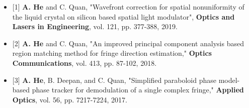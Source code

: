 \documentclass[a4paper,12pt]{article} %
\begin{document}
\begin{itemize} [leftmargin=0cm]
	\setlength\itemsep{-0.15em}
	\item[] {[1] \textbf{A. He} and C. Quan, "Wavefront correction for spatial nonuniformity of the liquid crystal on silicon based spatial light modulator",\textbf{ Optics and Lasers in Engineering}, vol. 121, pp. 377-388, 2019. }
	\item[] {[2] \textbf{A. He} and C. Quan, "An improved principal component analysis based region matching method for fringe direction estimation," \textbf{Optics Communications}, vol. 413, pp. 87-102, 2018.}
	\item[] {[3] \textbf{A. He}, B. Deepan, and C. Quan, "Simplified paraboloid phase model-based phase tracker for demodulation of a single complex fringe," \textbf{Applied Optics}, vol. 56, pp. 7217-7224, 2017.}
\end{itemize}
\end{document}
